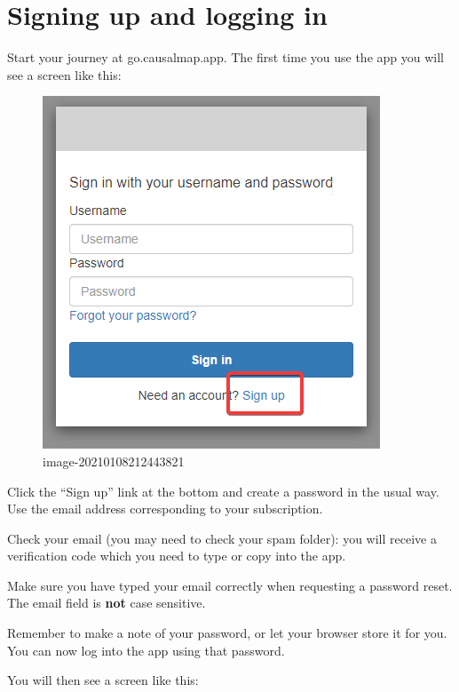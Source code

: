 \documentclass[
]{book}
\begin{document}
\hypertarget{signing-up-and-logging-in}{%
\section{Signing up and logging in}\label{signing-up-and-logging-in}}

Start your journey at go.causalmap.app. The first time you use the app you will see a screen like this:

\begin{figure}
\centering
\includegraphics{_assets/image-20210108212443821.png}
\caption{image-20210108212443821}
\end{figure}

Click the ``Sign up'' link at the bottom and create a password in the usual way. Use the email address corresponding to your subscription.

Check your email (you may need to check your spam folder): you will receive a verification code which you need to type or copy into the app.

Make sure you have typed your email correctly when requesting a password reset. The email field is \textbf{not} case sensitive.

Remember to make a note of your password, or let your browser store it for you. You can now log into the app using that password.

You will then see a screen like this:
\end{document}
